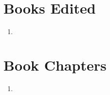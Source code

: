 \section*{Books Edited}

\begin{enumerate}
    \item {}
\end{enumerate}

\section*{Book Chapters}

\begin{enumerate}
    \item {}
\end{enumerate}


